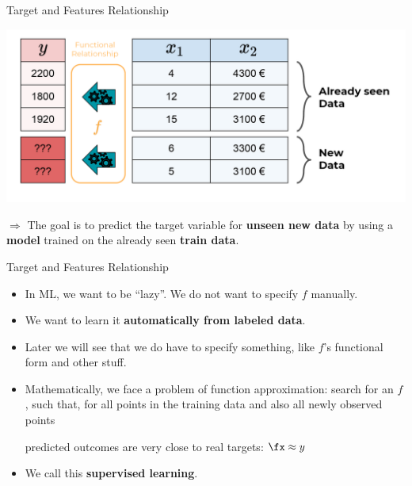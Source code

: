 \begin{frame}{Target and Features Relationship}

\scriptsize

\begin{center}\includegraphics[width=\textwidth]{plots/what_is_a_model_web} \end{center}

\(\Rightarrow\) The goal is to predict the target variable for
\textbf{unseen new data} by using a \textbf{model} trained on the
already seen \textbf{train data}.

\normalsize 

\end{frame}

\begin{frame}{Target and Features Relationship}

\begin{itemize}
\item
  In ML, we want to be \enquote{lazy}. We do not want to specify \(f\)
  manually.
\item
  We want to learn it \textbf{automatically from labeled data}.
\item
  Later we will see that we do have to specify something, like \(f\)'s
  functional form and other stuff.
\item
  Mathematically, we face a problem of function approximation: search
  for an \(f\), such that, for all points in the training data and also
  all newly observed points

\begin{center}
\end{center}

  predicted outcomes are very close to real targets: $\fx \approx y$

\end{itemize}

\begin{itemize}

\item
  We call this \textbf{supervised learning}.
\end{itemize}

\end{frame}

